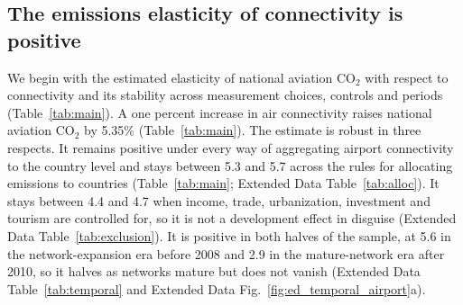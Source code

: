 \documentclass[12pt]{extarticle}
\begin{document}
\subsection*{The emissions elasticity of connectivity is positive}
We begin with the estimated elasticity of national aviation CO$_2$ with respect to connectivity and
its stability across measurement choices, controls and periods
(Table~\ref{tab:main}). A one percent increase in air connectivity raises national aviation CO$_2$
by 5.35\% (Table~\ref{tab:main}). The estimate is
robust in three respects. It remains positive under every way of
aggregating airport connectivity to the country level and stays between
5.3 and 5.7 across the rules for allocating emissions to countries
(Table~\ref{tab:main}; Extended Data Table~\ref{tab:alloc}). It stays
between 4.4 and 4.7 when income, trade, urbanization, investment and
tourism are controlled for, so it is not a development effect in disguise
(Extended Data Table~\ref{tab:exclusion}). It is positive in both halves
of the sample, at 5.6 in the network-expansion era before 2008 and 2.9 in
the mature-network era after 2010, so it halves as networks mature but
does not vanish (Extended Data Table~\ref{tab:temporal} and Extended Data
Fig.~\ref{fig:ed_temporal_airport}a).
\end{document}
